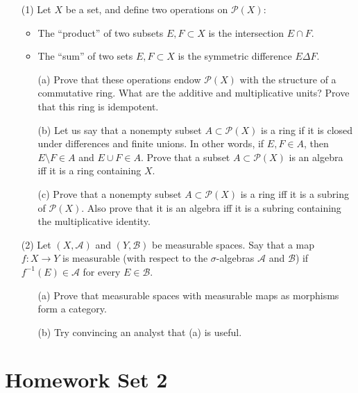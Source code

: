 \documentclass[lang=cn,11pt]{elegantbook}
\begin{document}
\begin{itemize}
    \item[(1)] Let $X$ be a set, and define two operations on $\mathcal{P}(X)$:
    \begin{itemize}
        \item The “product” of two subsets $E, F \subset X$ is the intersection $E \cap F$.
        \item The “sum” of two sets $E, F \subset X$ is the symmetric difference $E \Delta F$.
    \end{itemize}
    \begin{itemize}
        \item[(a)] Prove that these operations endow $\mathcal{P}(X)$ with the structure of a commutative ring. What are the additive and multiplicative units? Prove that this ring is idempotent.
        \item[(b)] Let us say that a nonempty subset $A \subset \mathcal{P}(X)$ is a ring if it is closed under differences and finite unions. In other words, if $E, F \in A$, then $E \setminus F \in A$ and $E \cup F \in A$. Prove that a subset $A \subset \mathcal{P}(X)$ is an algebra iff it is a ring containing $X$.
        \item[(c)] Prove that a nonempty subset $A \subset \mathcal{P}(X)$ is a ring iff it is a subring of $\mathcal{P}(X)$. Also prove that it is an algebra iff it is a subring containing the multiplicative identity.
    \end{itemize}
    \item[(2)] Let $(X, \mathcal{A})$ and $(Y, \mathcal{B})$ be measurable spaces. Say that a map $f : X \to Y$ is measurable (with respect to the $\sigma$-algebras $\mathcal{A}$ and $\mathcal{B}$) if $f^{-1}(E) \in \mathcal{A}$ for every $E \in \mathcal{B}$.
    \begin{itemize}
        \item[(a)] Prove that measurable spaces with measurable maps as morphisms form a category.
        \item[(b)] Try convincing an analyst that (a) is useful.
    \end{itemize}
\end{itemize}





\chapter{Homework Set 2}
\end{document}
